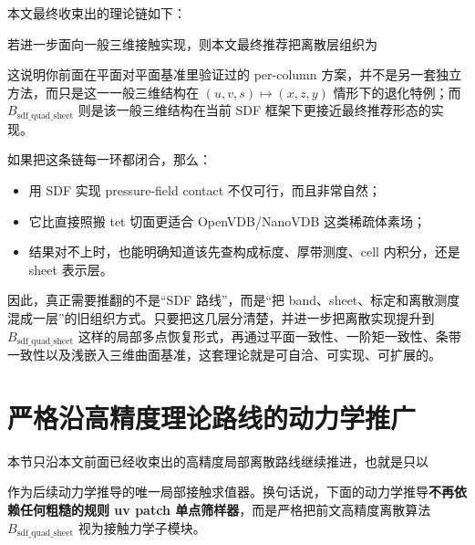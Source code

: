 \documentclass[12pt,a4paper]{ctexart}
\begin{document}
本文最终收束出的理论链如下：
\begin{center}
\end{center}

若进一步面向一般三维接触实现，则本文最终推荐把离散层组织为
\begin{center}
\end{center}
这说明你前面在平面对平面基准里验证过的 per-column 方案，并不是另一套独立方法，而只是这一一般三维结构在 $(u,v,s)\mapsto(x,z,y)$ 情形下的退化特例；而 $B_{\mathrm{sdf\_quad\_sheet}}$ 则是该一般三维结构在当前 SDF 框架下更接近最终推荐形态的实现。

如果把这条链每一环都闭合，那么：
\begin{itemize}
    \item 用 SDF 实现 pressure-field contact 不仅可行，而且非常自然；
    \item 它比直接照搬 tet 切面更适合 OpenVDB/NanoVDB 这类稀疏体素场；
    \item 结果对不上时，也能明确知道该先查构成标度、厚带测度、cell 内积分，还是 sheet 表示层。
\end{itemize}

因此，真正需要推翻的不是“SDF 路线”，而是“把 band、sheet、标定和离散测度混成一层”的旧组织方式。只要把这几层分清楚，并进一步把离散实现提升到 $B_{\mathrm{sdf\_quad\_sheet}}$ 这样的局部多点恢复形式，再通过平面一致性、一阶矩一致性、条带一致性以及浅嵌入三维曲面基准，这套理论就是可自洽、可实现、可扩展的。



\section{严格沿高精度理论路线的动力学推广}

本节只沿本文前面已经收束出的高精度局部离散路线继续推进，也就是只以
\begin{center}
\end{center}
作为后续动力学推导的唯一局部接触求值器。换句话说，下面的动力学推导\textbf{不再依赖任何粗糙的规则 uv patch 单点筛样器}，而是严格把前文高精度离散算法 $B_{\mathrm{sdf\_quad\_sheet}}$ 视为接触力学子模块。
\end{document}
